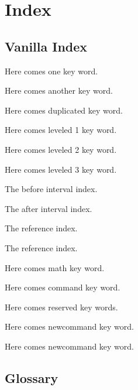 \section{Index}
\subsection{Vanilla Index}
Here comes one key word. 

Here comes another key word. 

Here comes duplicated key word. 

Here comes leveled 1 key word. 

Here comes leveled 2 key word. 

Here comes leveled 3 key word. 

The before interval index. 

The after interval index. 

The reference index. 

The reference index. 

Here comes math key word. 

Here comes command key word. 

Here comes reserved key words.    

Here comes newcommand key word. 

Here comes newcommand key word. 

\subsection{Glossary}

